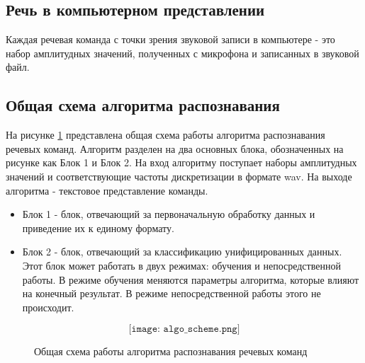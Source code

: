 \subsection{Речь в компьютерном представлении}
Каждая речевая команда с точки зрения звуковой записи в компьютере - это набор амплитудных значений, полученных с микрофона и записанных в звуковой файл.

\subsection{Общая схема алгоритма распознавания}
На рисунке \ref{fig:algo_scheme} представлена общая схема работы алгоритма распознавания речевых команд. Алгоритм разделен на два основных блока, обозначенных на рисунке как Блок 1 и Блок 2. На вход алгоритму поступает наборы амплитудных значений и соответствующие частоты дискретизации в формате wav. На выходе алгоритма - текстовое представление команды.

\begin{itemize}[leftmargin=2cm]
\item Блок 1 - блок, отвечающий за первоначальную обработку данных и приведение их к единому формату. 
\item Блок 2 - блок, отвечающий за классификацию унифицированных данных. Этот блок может работать в двух режимах: обучения и непосредственной работы. В режиме обучения меняются параметры алгоритма, которые влияют на конечный результат. В режиме непосредственной работы этого не происходит.
\end{itemize}


\begin{figure}[H]
  \[\texttt{[image: algo\_scheme.png]}\]
  \caption{Общая схема работы алгоритма распознавания речевых команд}
  \label{fig:algo_scheme}
\end{figure}
